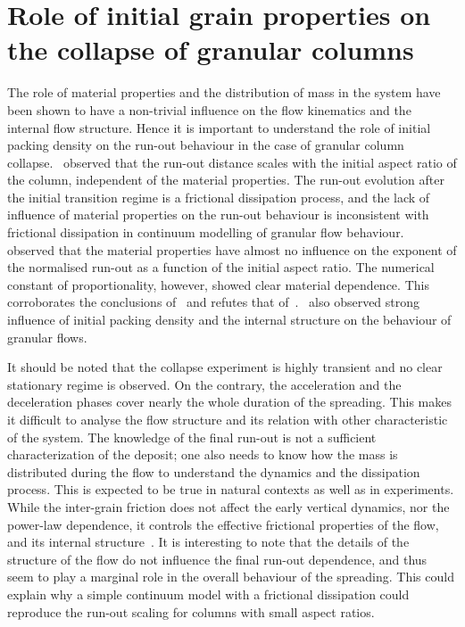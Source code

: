 \section{Role of initial grain properties on the collapse of granular columns}

The role of material properties and the distribution of mass in the system have 
been shown to have a non-trivial influence on the flow kinematics and the 
internal flow structure. Hence it is important to understand the role of 
initial packing density on the run-out behaviour in the case of granular column 
collapse.~\citet{Lube2005} observed that the run-out distance scales with the 
initial aspect ratio of the column, independent of the material properties. The 
run-out evolution after the initial transition regime is a frictional 
dissipation process, and the lack of influence of material properties on the 
run-out behaviour is inconsistent with frictional dissipation in continuum 
modelling of granular flow behaviour.~\citet{Balmforth2005} observed that the 
material properties have almost no influence on the exponent of the normalised 
run-out as a function of the initial aspect ratio. The numerical constant of 
proportionality, however, showed clear material dependence. This corroborates 
the conclusions of~\citet{Lajeunesse2004} and refutes that 
of~\citet{Lube2005}.~\citet{Daerr1999} also observed strong influence of 
initial packing density and the internal structure on the behaviour of 
granular flows. 


It should be noted that the collapse experiment is highly transient and no 
clear stationary regime is observed. On the contrary, the acceleration and the 
deceleration phases cover nearly the whole duration of the spreading. This 
makes it difficult to analyse the flow structure and its relation with other 
characteristic of the system. The knowledge of the final run-out is not a 
sufficient characterization of the deposit; one also needs to know how the mass 
is distributed during the flow to understand the dynamics and the dissipation 
process. This is expected to be true in natural contexts as well as in 
experiments. While the inter-grain friction does not affect the early vertical 
dynamics, nor the power-law dependence, it controls the effective frictional 
properties of the flow, and its internal structure~\citep{Staron2007a}. It is 
interesting to note that the details of the structure of the flow do not 
influence the final run-out dependence, and thus seem to play a marginal role 
in the overall behaviour of the spreading. This could explain why a simple 
continuum model with a frictional dissipation could reproduce the run-out 
scaling for columns with small aspect ratios. 


